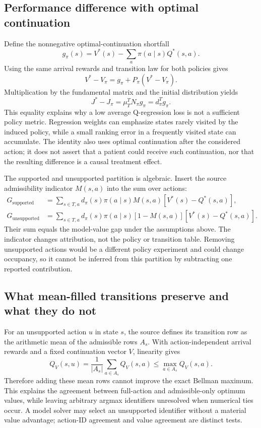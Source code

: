 \subsection{Performance difference with optimal continuation}
Define the nonnegative optimal-continuation shortfall
\begin{equation}
g_\pi(s)=V^*(s)-\sum_a\pi(a\mid s)Q^*(s,a).
\end{equation}
Using the same arrival rewards and transition law for both policies gives
\begin{equation}
V^*-V_\pi=g_\pi+P_\pi(V^*-V_\pi).
\end{equation}
Multiplication by the fundamental matrix and the initial distribution yields
\begin{equation}
J^*-J_\pi=\mu_T^TN_\pi g_\pi=d_\pi^Tg_\pi.
\end{equation}
This equality explains why a low average Q-regression loss is not a sufficient policy metric. Regression weights can emphasize states rarely visited by the induced policy, while a small ranking error in a frequently visited state can accumulate. The identity also uses optimal continuation after the considered action; it does not assert that a patient could receive such continuation, nor that the resulting difference is a causal treatment effect.

The supported and unsupported partition is algebraic. Insert the source admissibility indicator $M(s,a)$ into the sum over actions:
\begin{align}
G_{\mathrm{supported}}&=\sum_{s\in T,a}d_\pi(s)\pi(a\mid s)M(s,a)[V^*(s)-Q^*(s,a)],\\
G_{\mathrm{unsupported}}&=\sum_{s\in T,a}d_\pi(s)\pi(a\mid s)[1-M(s,a)][V^*(s)-Q^*(s,a)].
\end{align}
Their sum equals the model-value gap under the assumptions above. The indicator changes attribution, not the policy or transition table. Removing unsupported actions would be a different policy experiment and could change occupancy, so it cannot be inferred from this partition by subtracting one reported contribution.

\subsection{What mean-filled transitions preserve and what they do not}
For an unsupported action $u$ in state $s$, the source defines its transition row as the arithmetic mean of the admissible rows $A_s$. With action-independent arrival rewards and a fixed continuation vector $V$, linearity gives
\begin{equation}
Q_V(s,u)=\frac{1}{|A_s|}\sum_{a\in A_s}Q_V(s,a)
\leq\max_{a\in A_s}Q_V(s,a).
\end{equation}
Therefore adding these mean rows cannot improve the exact Bellman maximum. This explains the agreement between full-action and admissible-only optimum values, while leaving arbitrary argmax identifiers unresolved when numerical ties occur. A model solver may select an unsupported identifier without a material value advantage; action-ID agreement and value agreement are distinct tests.

